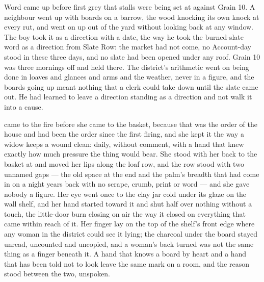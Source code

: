 \scenebreak

Word came up  before first grey that stalls were being set at  against Grain 10. A neighbour went up with boards on a barrow, the wood knocking its own knock at every rut, and went on up out of the yard without looking back at any window. The boy took it as a direction with a date, the way he took the burned-slate word as a direction from Slate Row: the market had not come, no Account-day stood in these three days, and no slate had been opened under any roof. Grain 10 was three mornings off and held there. The district's arithmetic went on being done in loaves and glances and arms and the weather, never in a figure, and the boards going up meant nothing that a clerk could take down until the slate came out. He had learned to leave a direction standing as a direction and not walk it into a cause.

 came to the fire before she came to the basket, because that was the order of the house and had been the order since the first firing, and she kept it the way a widow keeps a wound clean: daily, without comment, with a hand that knew exactly how much pressure the thing would bear. She stood with her back to the basket at  and moved her lips along the loaf row, and the row stood with two unnamed gaps --- the old space at the end and the palm's breadth that had come in on a night years back with no scrape, crumb, print or word --- and she gave nobody a figure. Her eye went once to the clay jar cold under its glaze on the wall shelf, and her hand started toward it and shut half over nothing without a touch, the little-door burn closing on air the way it closed on everything that came within reach of it. Her finger lay on the top of the shelf's front edge where any woman in the district could see it lying; the charcoal under the board stayed unread, uncounted and uncopied, and a woman's back turned was not the same thing as a finger beneath it. A hand that knows a board by heart and a hand that has been told not to look leave the same mark on a room, and the reason stood between the two, unspoken.

